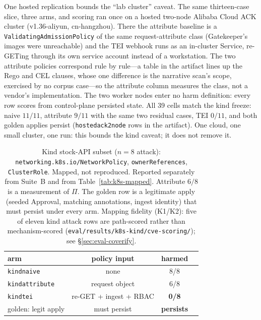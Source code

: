 \documentclass[acmsmall,manuscript,review,anonymous]{acmart}
\renewcommand{\_}{\discretionary{\textunderscore}{}{\textunderscore}}
\begin{document}
One hosted replication bounds the ``lab cluster'' caveat. The same
thirteen-case slice, three arms, and scoring ran once on a hosted two-node
{Alibaba Cloud} {ACK} cluster (v1.36-aliyun, cn-hangzhou). There the
attribute baseline is a \texttt{ValidatingAdmissionPolicy} of the same
request-attribute class (Gatekeeper's images were unreachable) and the
{TEI} webhook runs as an in-cluster Service, re-{GET}ing through its own
service account instead of a workstation. The two attribute policies
correspond rule by rule---a table in the artifact lines up the Rego and
{CEL} clauses, whose one difference is the narrative scan's scope,
exercised by no corpus case---so the attribute column measures the
class, not a vendor's implementation. The two worker nodes enter no harm
definition: every row scores from control-plane persisted state.
All 39 cells match the kind
freeze: naive $11/11$, attribute $9/11$ with the same two residual
cases, {TEI} $0/11$, and both golden applies persist
(\texttt{hosted\_ack\_2node} rows in the artifact).
One cloud, one small cluster, one run: this bounds the
kind caveat; it does not remove it.

\begin{table}[t]
\centering
\small
\caption{Kind stock-{API} subset ($n=8$ attack):
\texttt{networking.k8s.io/NetworkPolicy},
\texttt{ownerReferences}, \texttt{ClusterRole}.
Mapped, not reproduced. Reported separately from Suite~B and from
Table~\ref{tab:k8s-mapped}. Attribute $6/8$ is a measurement of $\Pi$.
The golden row is a legitimate apply (seeded Approval, matching
annotations, ingest identity) that must persist under every arm.
Mapping fidelity (K1/K2): five of eleven kind attack rows are
path-scored rather than mechanism-scored
(\texttt{eval/results/k8s-kind/cve-scoring/}); see
\S\ref{sec:eval-coverify}.}
\label{tab:k8s-real}
\begin{tabular}{@{}lccc@{}}
\hline
arm & policy input & harmed \\
\hline
\texttt{kind\_naive} & none & 8/8 \\
\texttt{kind\_attribute} & request object & 6/8 \\
\texttt{kind\_tei} & re-{GET} + ingest + {RBAC} & \textbf{0/8} \\
\hline
golden: legit apply & must persist & \textbf{persists} \\
\hline
\end{tabular}
\end{table}
\end{document}
